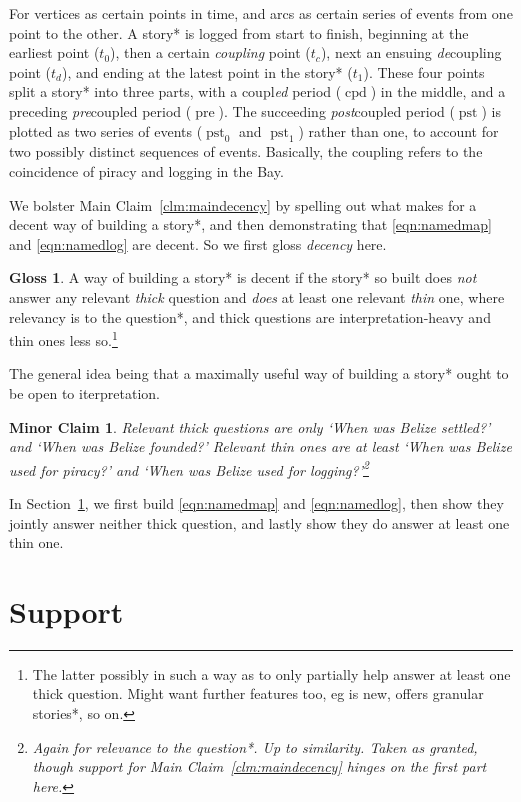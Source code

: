 \documentclass{amsart}
\newcommand{\ment}[1]{\textit{#1}} %
\DeclareMathOperator{\pre}{pre} %
\DeclareMathOperator{\pst}{pst} %
\DeclareMathOperator{\cpd}{cpd} %
\newtheorem{minrclm}{Minor Claim} %
\theoremstyle{definition}
\newtheorem{gloss}{Gloss} %
\theoremstyle{remark}
\begin{document}
	For vertices as certain points in time, and arcs as certain series of events from one point to the other. A story* is logged from start to finish, beginning at the earliest point (\(t_0\)), then a certain \ment{coupling} point (\(t_c\)), next an ensuing \ment{de}coupling point (\(t_d\)), and ending at the latest point in the story* (\(t_1\)). These four points split a story* into three parts, with a coupl\ment{ed} period (\(\cpd\)) in the middle, and a preceding \ment{pre}coupled period (\(\pre\)). The succeeding \ment{post}coupled period (\(\pst\)) is plotted as two series of events (\(\pst_0\) and \(\pst_1\)) rather than one, to account for two possibly distinct sequences of events. Basically, the coupling refers to the coincidence of piracy and logging in the Bay.
	
	We bolster Main Claim~\ref{clm:maindecency} by spelling out what makes for a decent way of building a story*, and then demonstrating that \ref{eqn:namedmap} and \ref{eqn:namedlog} are decent. So we first gloss \ment{decency} here.
	\begin{gloss}
	\label{gloss:decency}
		A way of building a story* is decent if the story* so built does \emph{not} answer any relevant \ment{thick} question and \emph{does} at least one relevant \ment{thin} one, where relevancy is to the question*, and thick questions are interpretation-heavy and thin ones less so.\footnote{The latter possibly in such a way as to only partially help answer at least one thick question. Might want further features too, eg is new, offers granular stories*, so on.}
	\end{gloss}
	The general idea being that a maximally useful way of building a story* ought to be open to iterpretation.
	\begin{minrclm}
	\label{clm:minorquestions}
	Relevant thick questions are only `When was Belize settled?' and `When was Belize founded?' Relevant thin ones are at least `When was Belize used for piracy?' and `When was Belize used for logging?'\footnote{Again for relevance to the question*. Up to similarity. Taken as granted, though support for Main Claim~\ref{clm:maindecency} hinges on the first part here.}
	\end{minrclm}
	In Section~\ref{s:support}, we first build \ref{eqn:namedmap} and \ref{eqn:namedlog}, then show they jointly answer neither thick question, and lastly show they do answer at least one thin one.
%
%
%
\section{Support}
\label{s:support}
\end{document}
